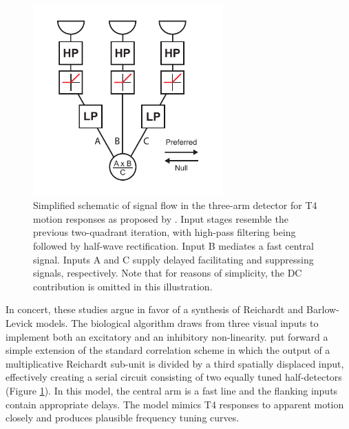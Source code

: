 \begin{figure}
    \centering
    \includegraphics[width=0.65\textwidth]{graphics/figure_models2}
    \caption[Combining Reichardt and Barlow-Levick detectors]
    {Simplified schematic of signal flow in the three-arm detector for T4 motion responses as proposed by \citet{Haag:2016cq}. Input stages resemble the previous two-quadrant iteration, with high-pass filtering being followed by half-wave rectification. Input B mediates a fast central signal. Inputs A and C supply delayed facilitating and suppressing signals, respectively. Note that for reasons of simplicity, the DC contribution is omitted in this illustration.}
    \label{fig:detector2}
\end{figure}

In concert, these studies argue in favor of a synthesis of Reichardt and Barlow-Levick models. The biological algorithm draws from three visual inputs to implement both an excitatory and an inhibitory non-linearity. \citet{Haag:2016cq} put forward a simple extension of the standard correlation scheme in which the output of a multiplicative Reichardt sub-unit is divided by a third spatially displaced input, effectively creating a serial circuit consisting of two equally tuned half-detectors (Figure \ref{fig:detector2}). In this model, the central arm is a fast line and the flanking inputs contain appropriate delays. The model mimics T4 responses to apparent motion closely and produces plausible frequency tuning curves.

